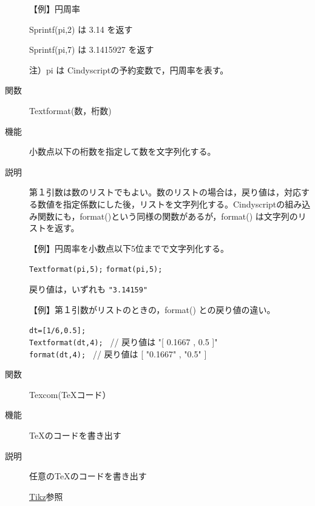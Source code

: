 \documentclass[papersize,a4paper,10pt,uplatex]{jsarticle}
\begin{document}
\begin{description}
\vspace{\baselineskip}
【例】円周率

 Sprintf(pi,2) は 3.14 を返す

 Sprintf(pi,7) は 3.1415927 を返す

注）pi は Cindyscriptの予約変数で，円周率を表す。%

\vspace{\baselineskip}
\hypertarget{textformat}{}
\item[関数]Textformat(数，桁数)
\item[機能]小数点以下の桁数を指定して数を文字列化する。
\item[説明]第１引数は数のリストでもよい。数のリストの場合は，戻り値は，対応する数値を指定係数にした後，リストを文字列化する。Cindyscriptの組み込み関数にも，format()という同様の関数があるが，format() は文字列のリストを返す。

\vspace{\baselineskip}
【例】円周率を小数点以下5位までで文字列化する。

\hspace{10mm} \verb|Textformat(pi,5);|
\hspace{10mm} \verb|format(pi,5);|

戻り値は，いずれも \verb|"3.14159"|

\vspace{\baselineskip}
【例】第１引数がリストのときの，format() との戻り値の違い。

\hspace{10mm} \verb|dt=[1/6,0.5];|\\
\hspace{10mm} \verb|Textformat(dt,4); | // 戻り値は "[ 0.1667 , 0.5 ]" \\
\hspace{10mm} \verb|format(dt,4); | // 戻り値は [ "0.1667" , "0.5" ] \\


\vspace{\baselineskip}
\hypertarget{texcom}{}
\item[関数]Texcom(\TeX コード）
\item[機能]\TeX のコードを書き出す
\item[説明]任意の\TeX のコードを書き出す

\hspace*{10mm}\hyperlink{tikztexcom}{Tikz}参照


\end{description}
\end{document}
